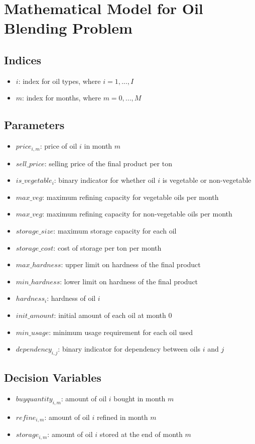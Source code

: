 \documentclass{article}
\begin{document}
\section*{Mathematical Model for Oil Blending Problem}

\subsection*{Indices}
\begin{itemize}
    \item $i$: index for oil types, where $i = 1, ..., I$
    \item $m$: index for months, where $m = 0, ..., M$
\end{itemize}

\subsection*{Parameters}
\begin{itemize}
    \item $price_{i,m}$: price of oil $i$ in month $m$
    \item $sell\_price$: selling price of the final product per ton
    \item $is\_vegetable_{i}$: binary indicator for whether oil $i$ is vegetable or non-vegetable
    \item $max\_veg$: maximum refining capacity for vegetable oils per month
    \item $max\_veg$: maximum refining capacity for non-vegetable oils per month
    \item $storage\_size$: maximum storage capacity for each oil
    \item $storage\_cost$: cost of storage per ton per month
    \item $max\_hardness$: upper limit on hardness of the final product
    \item $min\_hardness$: lower limit on hardness of the final product
    \item $hardness_{i}$: hardness of oil $i$
    \item $init\_amount$: initial amount of each oil at month 0
    \item $min\_usage$: minimum usage requirement for each oil used
    \item $dependency_{i,j}$: binary indicator for dependency between oils $i$ and $j$
\end{itemize}

\subsection*{Decision Variables}
\begin{itemize}
    \item $buyquantity_{i,m}$: amount of oil $i$ bought in month $m$
    \item $refine_{i,m}$: amount of oil $i$ refined in month $m$
    \item $storage_{i,m}$: amount of oil $i$ stored at the end of month $m$
\end{itemize}
\end{document}
